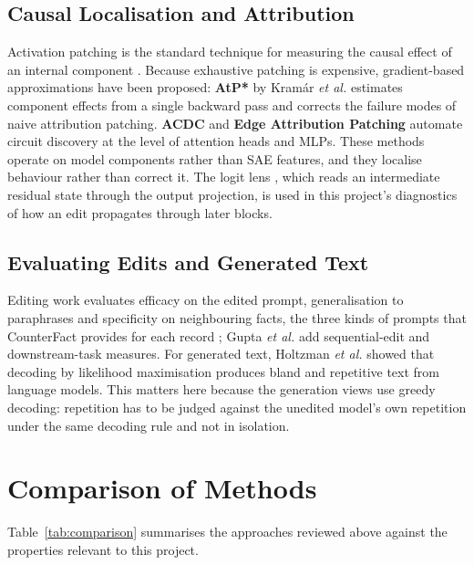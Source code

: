 \documentclass[12pt,a4paper]{report}
\begin{document}
\subsection{Causal Localisation and Attribution}

Activation patching is the standard technique for measuring the causal effect of an internal component \cite{r21}. Because exhaustive patching is expensive, gradient-based approximations have been proposed: \textbf{AtP*} by Kram\'ar \textit{et al.} \cite{r16} estimates component effects from a single backward pass and corrects the failure modes of naive attribution patching. \textbf{ACDC} \cite{r17} and \textbf{Edge Attribution Patching} \cite{r18} automate circuit discovery at the level of attention heads and MLPs. These methods operate on model components rather than SAE features, and they localise behaviour rather than correct it. The logit lens \cite{r37}, which reads an intermediate residual state through the output projection, is used in this project's diagnostics of how an edit propagates through later blocks.

\subsection{Evaluating Edits and Generated Text}

Editing work evaluates efficacy on the edited prompt, generalisation to paraphrases and specificity on neighbouring facts, the three kinds of prompts that CounterFact provides for each record \cite{r2}; Gupta \textit{et al.} \cite{r4} add sequential-edit and downstream-task measures. For generated text, Holtzman \textit{et al.} \cite{r35} showed that decoding by likelihood maximisation produces bland and repetitive text from language models. This matters here because the generation views use greedy decoding: repetition has to be judged against the unedited model's own repetition under the same decoding rule and not in isolation.

\section{Comparison of Methods}

Table~\ref{tab:comparison} summarises the approaches reviewed above against the properties relevant to this project.
\end{document}
